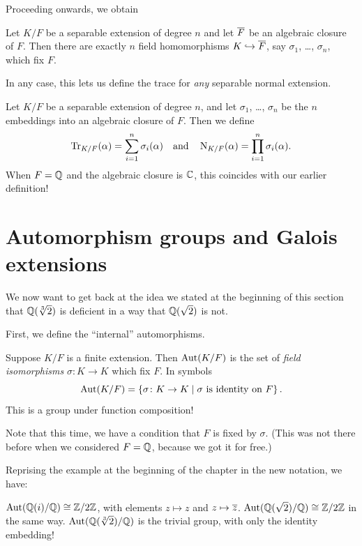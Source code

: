 Proceeding onwards, we obtain
\begin{theorem}
	Let $K/F$ be a separable extension of degree $n$
	and let $\overline F$ be an algebraic closure of $F$.
	Then there are exactly $n$ field homomorphisms $K \hookrightarrow \overline F$,
	say $\sigma_1$, \dots, $\sigma_n$, which fix $F$.
\end{theorem}

In any case, this lets us define the trace for \emph{any} separable normal extension.
\begin{definition}
Let $K/F$ be a separable extension of degree $n$, and let $\sigma_1$, \dots, $\sigma_n$
be the $n$ embeddings into an algebraic closure of $F$. Then we define
\[
	\operatorname{Tr}_{K/F}(\alpha) = \sum_{i=1}^n \sigma_i(\alpha)
	\quad\text{and}\quad
	\operatorname{N}_{K/F}(\alpha) = \prod_{i=1}^n \sigma_i(\alpha).
\]
When $F = \mathbb Q$ and the algebraic closure is $\mathbb C$, this coincides with our earlier definition!
\end{definition}

\section{Automorphism groups and Galois extensions}
We now want to get back at the idea we stated at the beginning of
this section that $\mathbb Q(\sqrt[3]{2})$ is deficient in a way that $\mathbb Q(\sqrt 2)$ is not.

First, we define the ``internal'' automorphisms.
\begin{definition}
	Suppose $K/F$ is a finite extension.
	Then $\operatorname{Aut}(K/F)$ is the set of \emph{field isomorphisms} $\sigma \colon K \to K$ which fix $F$.
	In symbols
	\[ \operatorname{Aut}(K/F) =
		\left\{ \sigma \colon K \to K \mid \text{$\sigma$ is identity on $F$} \right\}. \]
	This is a group under function composition!
\end{definition}
Note that this time, we have a condition that $F$ is fixed by $\sigma$.
(This was not there before when we considered $F = \mathbb Q$, because we got it for free.)

\begin{example}
	Reprising the example at the beginning of the chapter in the new notation, we have:
	\begin{enumerate}[(a)]
		\ii $\operatorname{Aut}(\mathbb Q(i) / \mathbb Q) \cong \mathbb Z/2\mathbb Z$, with elements $z \mapsto z$ and $z \mapsto \overline z$.
		\ii $\operatorname{Aut}(\mathbb Q(\sqrt 2) / \mathbb Q) \cong \mathbb Z/2\mathbb Z$ in the same way.
		\ii $\operatorname{Aut}(\mathbb Q(\sqrt[3]{2}) / \mathbb Q)$ is the trivial group, with only the identity embedding!
	\end{enumerate}
\end{example}

